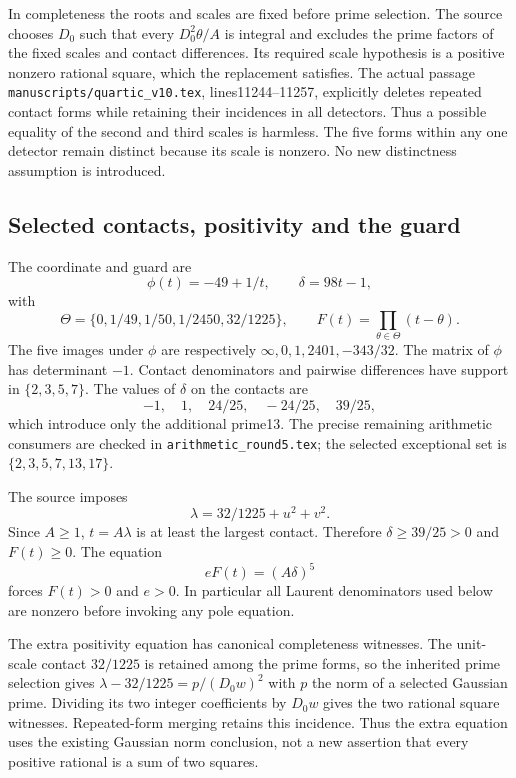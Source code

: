 In completeness the roots and scales are fixed before prime selection.
The source chooses $D_0$ such that every $D_0^2\theta/A$ is integral and
excludes the prime factors of the fixed scales and contact differences.
Its required scale hypothesis is a positive nonzero rational square,
which the replacement satisfies. The actual passage
\texttt{manuscripts/quartic\_v10.tex}, lines11244--11257, explicitly
deletes repeated contact forms while retaining their incidences in all
detectors. Thus a possible equality of the second and third scales is
harmless. The five forms within any one detector remain distinct because
its scale is nonzero. No new distinctness assumption is introduced.

\subsection{Selected contacts, positivity and the guard}

The coordinate and guard are
\[
 \phi(t)=-49+1/t,\qquad \delta=98t-1,
\]
with
\[
 \Theta=\{0,1/49,1/50,1/2450,32/1225\},\qquad
 F(t)=\prod_{\theta\in\Theta}(t-\theta).
\]
The five images under $\phi$ are respectively
$\infty,0,1,2401,-343/32$. The matrix of $\phi$ has determinant $-1$.
Contact denominators and pairwise differences have support in
$\{2,3,5,7\}$. The values of $\delta$ on the contacts are
\[
 -1,\quad1,\quad24/25,\quad-24/25,\quad39/25,
\]
which introduce only the additional prime13. The precise remaining
arithmetic consumers are checked in \texttt{arithmetic\_round5.tex};
the selected exceptional set is $\{2,3,5,7,13,17\}$.

The source imposes
\[
 \lambda=32/1225+u^2+v^2.
\]
Since $A\ge1$, $t=A\lambda$ is at least the largest contact. Therefore
$\delta\ge39/25>0$ and $F(t)\ge0$. The equation
\[
 eF(t)=(A\delta)^5
\]
forces $F(t)>0$ and $e>0$. In particular all Laurent denominators used
below are nonzero before invoking any pole equation.

The extra positivity equation has canonical completeness witnesses.
The unit-scale contact $32/1225$ is retained among the prime forms, so
the inherited prime selection gives
$\lambda-32/1225=p/(D_0w)^2$ with $p$ the norm of a selected Gaussian
prime. Dividing its two integer coefficients by $D_0w$ gives the two
rational square witnesses. Repeated-form merging retains this incidence.
Thus the extra equation uses the existing Gaussian norm conclusion,
not a new assertion that every positive rational is a sum of two squares.

